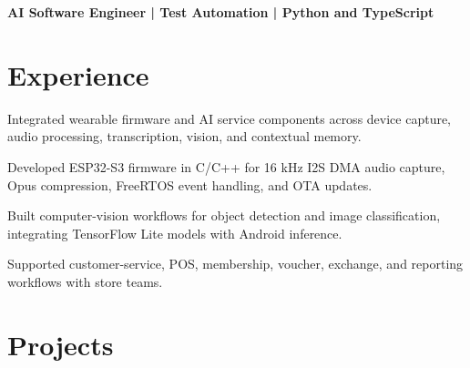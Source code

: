\documentclass{../../../templates/1/resume}
\begin{document}

{\small\bfseries AI Software Engineer | Test Automation | Python and TypeScript}\par\vspace{2pt}

\section{Experience}

\begin{resumeitemize}
\item Integrated wearable firmware and AI service components across device capture, audio processing, transcription, vision, and contextual memory.
\item Developed ESP32-S3 firmware in C/C++ for 16 kHz I2S DMA audio capture, Opus compression, FreeRTOS event handling, and OTA updates.
\end{resumeitemize}

\begin{resumeitemize}
\item Built computer-vision workflows for object detection and image classification, integrating TensorFlow Lite models with Android inference.
\end{resumeitemize}

\begin{resumeitemize}
\item Supported customer-service, POS, membership, voucher, exchange, and reporting workflows with store teams.
\end{resumeitemize}

\section{Projects}
\end{document}
